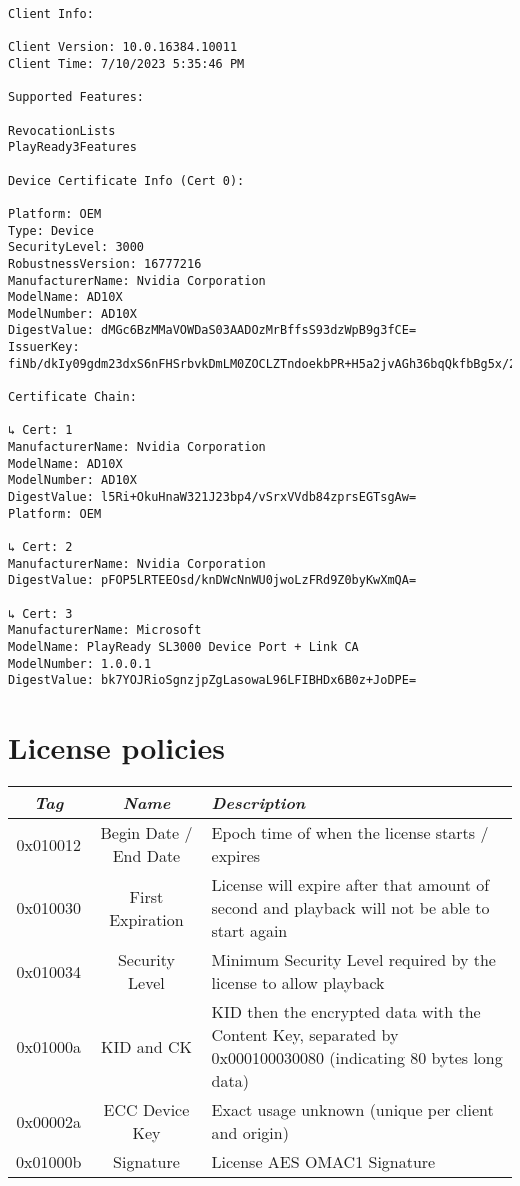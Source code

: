 \documentclass[11pt, a4paper]{IEEEtran}
\begin{document}
\begin{appendices}
\begin{lstlisting}[breaklines, caption={Client Information and Signature Key from a computer with an Nvidia 4070}]
Client Info:

Client Version: 10.0.16384.10011
Client Time: 7/10/2023 5:35:46 PM

Supported Features:

RevocationLists
PlayReady3Features

Device Certificate Info (Cert 0):

Platform: OEM
Type: Device
SecurityLevel: 3000
RobustnessVersion: 16777216
ManufacturerName: Nvidia Corporation
ModelName: AD10X
ModelNumber: AD10X
DigestValue: dMGc6BzMMaVOWDaS03AADOzMrBffsS93dzWpB9g3fCE=
IssuerKey: fiNb/dkIy09gdm23dxS6nFHSrbvkDmLM0ZOCLZTndoekbPR+H5a2jvAGh36bqQkfbBg5x/2PdqPw/rTr5kuIUQ==

Certificate Chain:

↳ Cert: 1
ManufacturerName: Nvidia Corporation
ModelName: AD10X
ModelNumber: AD10X
DigestValue: l5Ri+OkuHnaW321J23bp4/vSrxVVdb84zprsEGTsgAw=
Platform: OEM

↳ Cert: 2
ManufacturerName: Nvidia Corporation
DigestValue: pFOP5LRTEEOsd/knDWcNnWU0jwoLzFRd9Z0byKwXmQA=

↳ Cert: 3
ManufacturerName: Microsoft
ModelName: PlayReady SL3000 Device Port + Link CA
ModelNumber: 1.0.0.1
DigestValue: bk7YOJRioSgnzjpZgLasowaL96LFIBHDx6B0z+JoDPE=
\end{lstlisting}

\pagebreak
\section{License policies} \label{appendix:licensefields}
\centering
\begin{tabular}{|c|c|p{10cm}|}
\hline
\emph{Tag} & \emph{Name} & \emph{Description}\\
\hline
\hline
0x010012 & Begin Date / End Date & Epoch time of when the license starts / expires\\
\hline
0x010030 & First Expiration & License will expire after that amount of second and playback will not be able to start again \\
\hline
0x010034 & Security Level & Minimum Security Level required by the license to allow playback\\
\hline
0x01000a & KID and CK & KID then the encrypted data with the Content Key, separated by 0x000100030080 (indicating 80 bytes long data)\\
\hline
0x00002a & ECC Device Key & Exact usage unknown (unique per client and origin)\\
\hline
0x01000b & Signature & License AES OMAC1 Signature\\
\hline

\end{tabular}



\end{appendices}
\end{document}
